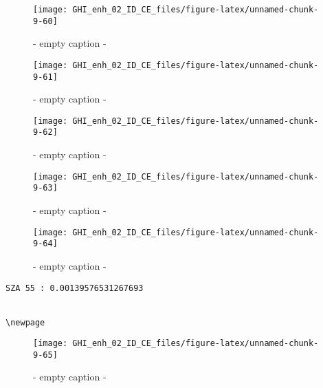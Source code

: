 \documentclass[
  10pt,
  a4paper,oneside]{article}
\begin{document}
\begin{figure}[H]

{\centering \texttt{[image: GHI\_enh\_02\_ID\_CE\_files/figure-latex/unnamed-chunk-9-60]} 

}

\caption{ - empty caption - }\label{fig:unnamed-chunk-9-60}
\end{figure}
\begin{figure}[H]

{\centering \texttt{[image: GHI\_enh\_02\_ID\_CE\_files/figure-latex/unnamed-chunk-9-61]} 

}

\caption{ - empty caption - }\label{fig:unnamed-chunk-9-61}
\end{figure}
\begin{figure}[H]

{\centering \texttt{[image: GHI\_enh\_02\_ID\_CE\_files/figure-latex/unnamed-chunk-9-62]} 

}

\caption{ - empty caption - }\label{fig:unnamed-chunk-9-62}
\end{figure}
\begin{figure}[H]

{\centering \texttt{[image: GHI\_enh\_02\_ID\_CE\_files/figure-latex/unnamed-chunk-9-63]} 

}

\caption{ - empty caption - }\label{fig:unnamed-chunk-9-63}
\end{figure}
\begin{figure}[H]

{\centering \texttt{[image: GHI\_enh\_02\_ID\_CE\_files/figure-latex/unnamed-chunk-9-64]} 

}

\caption{ - empty caption - }\label{fig:unnamed-chunk-9-64}
\end{figure}

\begin{verbatim}
SZA 55 : 0.00139576531267693 


\newpage
\end{verbatim}

\begin{figure}[H]

{\centering \texttt{[image: GHI\_enh\_02\_ID\_CE\_files/figure-latex/unnamed-chunk-9-65]} 

}

\caption{ - empty caption - }\label{fig:unnamed-chunk-9-65}
\end{figure}
\end{document}
